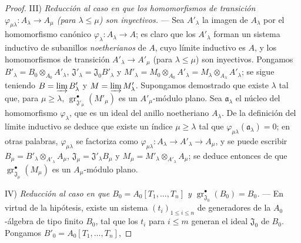 \begin{proof}
\medskip
\noindent III) \emph{Reducción al caso en que los homomorfismos de transición $\varphi_{\mu\lambda}:A_\lambda\to A_\mu$ (para $\lambda\leq\mu$) son inyectivos.} --- Sea $A'_\lambda$ la imagen de $A_\lambda$ por el homomorfismo canónico $\varphi_\lambda:A_\lambda\to A$; es claro que los $A'_\lambda$ forman un sistema inductivo de subanillos \emph{noetherianos} de $A$, cuyo límite inductivo es $A$, y los homomorfismos de transición $A'_\lambda\to A'_\mu$ (para $\lambda\leq\mu$) son inyectivos. Pongamos $B'_\lambda=B_0\otimes_{A_0}A'_\lambda$, $\mathfrak J'_\lambda=\mathfrak J_0B'_\lambda$ y $M'_\lambda=M_0\otimes_{A_0}A'_\lambda=M_\lambda\otimes_{A_\lambda}A'_\lambda$; se sigue teniendo $B=\varinjlim B'_\lambda$ y $M=\varinjlim M'_\lambda$. Supongamos demostrado que existe $\lambda$ tal que, para $\mu\geq\lambda$, $\operatorname{gr}_{\mathfrak J'_\mu}^\bullet(M'_\mu)$ es un $A'_\mu$-módulo plano. Sea $\mathfrak a_\lambda$ el núcleo del homomorfismo $\varphi_\lambda$, que es un ideal del anillo noetheriano $A_\lambda$. De la definición del límite inductivo se deduce que existe un índice $\mu\geq\lambda$ tal que $\varphi_{\mu\lambda}(\mathfrak a_\lambda)=0$; en otras palabras, $\varphi_{\mu\lambda}$ se factoriza como $\varphi_{\mu\lambda}:A_\lambda\to A'_\lambda\to A_\mu$, y se puede escribir $B_\mu=B'_\lambda\otimes_{A'_\lambda}A_\mu$, $\mathfrak J_\mu=\mathfrak J'_\lambda B_\mu$ y $M_\mu=M'_\lambda\otimes_{A'_\lambda}A_\mu$; se deduce entonces de  que $\operatorname{gr}_{\mathfrak J_\mu}^\bullet(M_\mu)$ es un $A_\mu$-módulo plano.

\medskip
\noindent IV) \emph{Reducción al caso en que $B_0=A_0[T_1,\ldots,T_n]$ y $\operatorname{gr}_{\mathfrak J_0}^\bullet(B_0)=B_0$.} --- En virtud de la hipótesis, existe un sistema $(t_i)_{1\leq i\leq n}$ de generadores de la $A_0$-álgebra de tipo finito $B_0$, tal que los $t_i$ para $i\leq m$ generan el ideal $\mathfrak J_0$ de $B_0$. Pongamos $B'_0=A_0[T_1,\ldots,T_n]$, 



\end{proof}
